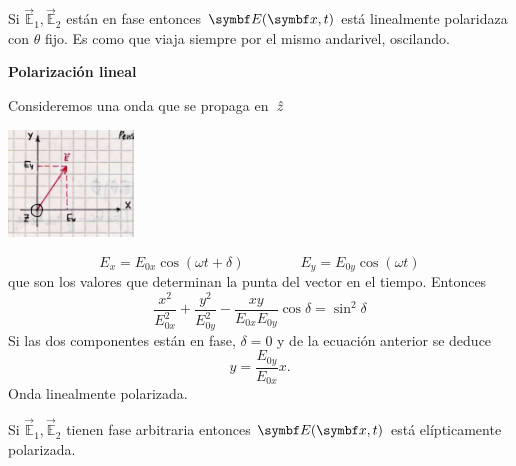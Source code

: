 \documentclass[10pt,oneside]{CBFT_book}
\begin{document}
Si $\vec{\mathbb{E}}_1,\vec{\mathbb{E}}_2$ están en fase entonces $\vb{E}( \vb{x},t )$ está linealmente
polaridaza con $\theta$ fijo. Es como que  viaja siempre por el mismo andarivel, oscilando. 

\begin{ejemplo}{\bf Polarización lineal}

Consideremos una onda que se propaga en $\:\hat{z}$

\includegraphics[width=0.25\textwidth]{images/fig_ft1_ondas_polarizacion_lineal.jpg} 

\[
	E_x = E_{0x} \cos( \omega t + \delta ) \qquad \qquad 
	E_y = E_{0y} \cos( \omega t )
\]
que son los valores que determinan la punta del vector en el tiempo.
Entonces
\[
	\frac{x^2}{E^2_{0x}} + \frac{y^2}{E^2_{0y}} - \frac{xy}{E_{0x}E_{0y}} \cos\delta = \sin^2\delta
\]
Si las dos componentes están en fase, $\delta = 0$ y de la ecuación anterior se deduce
\[
	y = \frac{ E_{0y} }{ E_{0x} } x.
\]
Onda linealmente polarizada.
\end{ejemplo}


Si $\vec{\mathbb{E}}_1,\vec{\mathbb{E}}_2$ tienen fase arbitraria entonces $\vb{E}( \vb{x},t )$ está elípticamente 
polarizada.
\end{document}
